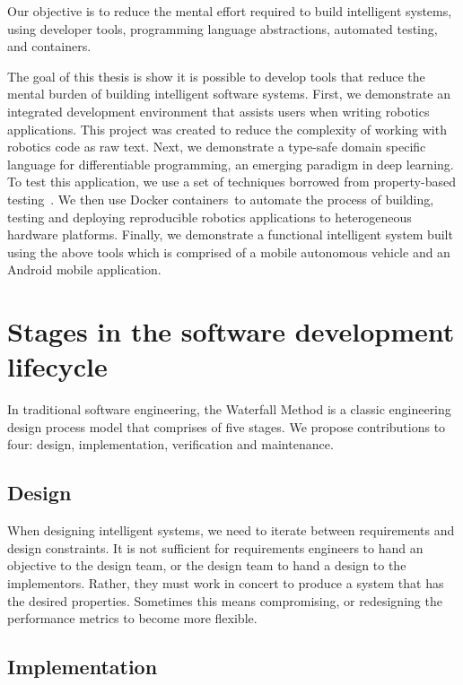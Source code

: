 \documentclass[12pt,initial,twoside,maitrise]{dms}
\numberwithin{equation}{section}
\numberwithin{table}{chapter}
\numberwithin{figure}{chapter}
\begin{document}
Our objective is to reduce the mental effort required to build intelligent systems, using developer tools, programming language abstractions, automated testing, and containers.

The goal of this thesis is show it is possible to develop tools that reduce the mental burden of building intelligent software systems. First, we demonstrate an integrated development environment that assists users when writing robotics applications. This project was created to reduce the complexity of working with robotics code as raw text. Next, we demonstrate a type-safe domain specific language for differentiable programming, an emerging paradigm in deep learning. To test this application, we use a set of techniques borrowed from property-based testing~\cite{fink1997property}. We then use Docker containers~\cite{merkel2014docker}to automate the process of building, testing and deploying reproducible robotics applications to heterogeneous hardware platforms. Finally, we demonstrate a functional intelligent system built using the above tools which is comprised of a mobile autonomous vehicle and an Android mobile application.

\section{Stages in the software development lifecycle}\label{sec:sldc-stages}

In traditional software engineering, the Waterfall Method is a classic engineering design process model that comprises of five stages. We propose contributions to four: design, implementation, verification and maintenance.

\subsection{Design}

When designing intelligent systems, we need to iterate between requirements and design constraints. It is not sufficient for requirements engineers to hand an objective to the design team, or the design team to hand a design to the implementors. Rather, they must work in concert to produce a system that has the desired properties. Sometimes this means compromising, or redesigning the performance metrics to become more flexible.

\subsection{Implementation}
\end{document}
